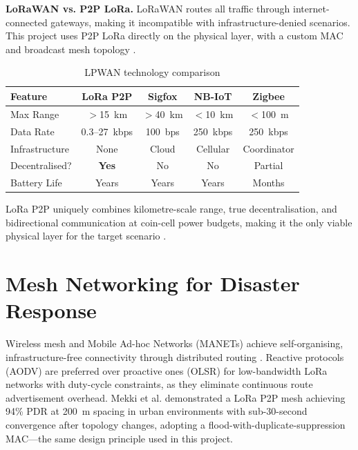 \textbf{LoRaWAN vs. P2P LoRa.} LoRaWAN routes all traffic through internet-connected gateways, making it incompatible with infrastructure-denied scenarios. This project uses P2P LoRa directly on the physical layer, with a custom MAC and broadcast mesh topology \cite{Centenaro2016, Bor2016}.

\begin{table}[h]
\centering
\caption{LPWAN technology comparison}
\label{tab:lpwan_comparison}
\renewcommand{\arraystretch}{1.2}
\begin{tabular}{lcccc}
\hline
\textbf{Feature} & \textbf{LoRa P2P} & \textbf{Sigfox} & \textbf{NB-IoT} & \textbf{Zigbee} \\
\hline
Max Range       & $>$15~km  & $>$40~km  & $<$10~km  & $<$100~m \\
Data Rate       & 0.3--27~kbps & 100~bps & 250~kbps & 250~kbps \\
Infrastructure  & None       & Cloud     & Cellular  & Coordinator \\
Decentralised?  & \textbf{Yes} & No      & No        & Partial \\
Battery Life    & Years      & Years     & Years     & Months \\
\hline
\end{tabular}
\end{table}

LoRa P2P uniquely combines kilometre-scale range, true decentralisation, and bidirectional communication at coin-cell power budgets, making it the only viable physical layer for the target scenario \cite{Raza2017}.

\section{Mesh Networking for Disaster Response}

Wireless mesh and Mobile Ad-hoc Networks (MANETs) achieve self-organising, infrastructure-free connectivity through distributed routing \cite{Gomez2012}. Reactive protocols (AODV) are preferred over proactive ones (OLSR) for low-bandwidth LoRa networks with duty-cycle constraints, as they eliminate continuous route advertisement overhead. Mekki et al. \cite{Mekki2019} demonstrated a LoRa P2P mesh achieving 94\% PDR at 200~m spacing in urban environments with sub-30-second convergence after topology changes, adopting a flood-with-duplicate-suppression MAC—the same design principle used in this project.

